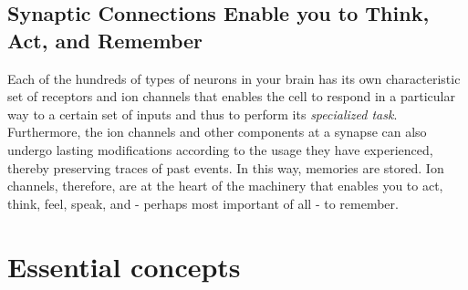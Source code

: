 \subsection{Synaptic Connections Enable you to Think, Act, and Remember}

Each of the hundreds of types of neurons in your brain has its own characteristic set
of receptors and ion channels that enables the cell to respond in a particular
way to a certain set of inputs and thus to perform its \textit{specialized
task}. Furthermore, the ion channels and other components at a synapse
can also undergo lasting modifications according to the usage they have
experienced, thereby preserving traces of past events. In this way, memories
are stored. Ion channels, therefore, are at the heart of the machinery
that enables you to act, think, feel, speak, and - perhaps most important
of all - to remember.

\section{Essential concepts}

